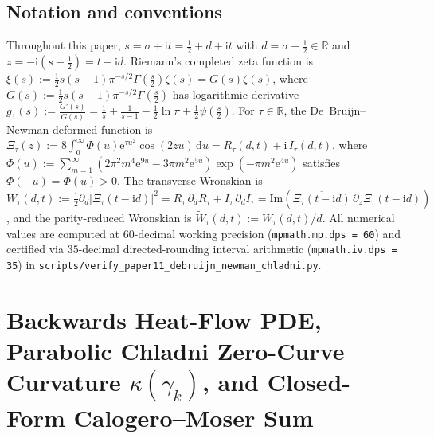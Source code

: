 \documentclass[11pt,reqno]{amsart}
\theoremstyle{definition}
\theoremstyle{remark}
\numberwithin{equation}{section}
\newcommand{\R}{\mathbb{R}}
\newcommand{\dd}{\mathrm{d}}
\newcommand{\ee}{\mathrm{e}}
\newcommand{\ii}{\mathrm{i}}
\newcommand{\Ima}{\mathrm{Im}}
\begin{document}
\subsection{Notation and conventions}\label{subsec:notation}

Throughout this paper, $s = \sigma + \ii t = \frac{1}{2} + d + \ii t$ with $d = \sigma - \frac{1}{2} \in \R$ and $z = -\ii(s - \frac{1}{2}) = t - \ii d$. Riemann's completed zeta function is $\xi(s) := \frac{1}{2}s(s-1)\pi^{-s/2}\Gamma(\frac{s}{2})\zeta(s) = G(s)\zeta(s)$, where $G(s) := \frac{1}{2}s(s-1)\pi^{-s/2}\Gamma(\frac{s}{2})$ has logarithmic derivative $g_1(s) := \frac{G'(s)}{G(s)} = \frac{1}{s} + \frac{1}{s-1} - \frac{1}{2}\ln\pi + \frac{1}{2}\psi(\frac{s}{2})$. For $\tau \in \R$, the De~Bruijn--Newman deformed function is $\Xi_\tau(z) := 8\int_0^\infty \Phi(u)\ee^{\tau u^2}\cos(2zu)\,\dd u = R_\tau(d,t) + \ii\,I_\tau(d,t)$, where $\Phi(u) := \sum_{m=1}^\infty (2\pi^2 m^4\ee^{9u} - 3\pi m^2\ee^{5u})\exp(-\pi m^2\ee^{4u})$ satisfies $\Phi(-u) = \Phi(u) > 0$. The transverse Wronskian is $W_\tau(d,t) := \frac{1}{2}\partial_d|\Xi_\tau(t-\ii d)|^2 = R_\tau\,\partial_d R_\tau + I_\tau\,\partial_d I_\tau = \Ima(\overline{\Xi_\tau(t-\ii d)}\,\partial_z\Xi_\tau(t-\ii d))$, and the parity-reduced Wronskian is $\widetilde{W}_\tau(d,t) := W_\tau(d,t)/d$. All numerical values are computed at $60$-decimal working precision (\texttt{mpmath.mp.dps = 60}) and certified via $35$-decimal directed-rounding interval arithmetic (\texttt{mpmath.iv.dps = 35}) in \texttt{scripts/}\allowbreak\texttt{verify\_paper11\_}\allowbreak\texttt{debruijn\_newman\_}\allowbreak\texttt{chladni.py}.

\section{Backwards Heat-Flow PDE, Parabolic Chladni Zero-Curve Curvature \texorpdfstring{$\kappa(\gamma_k)$}{kappa(gamma\_k)}, and Closed-Form Calogero--Moser Sum}\label{sec:chladni_velocity}
\end{document}

